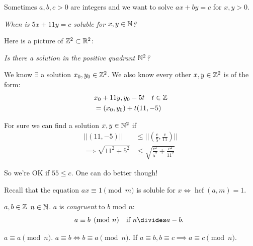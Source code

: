 \documentclass[10pt]{scrartcl}
\DeclareMathOperator{\hcf}{hcf}
\begin{document}
Sometimes $a,b, c >0$ are integers and we want to solve $ax + by = c$ for $x,y  > 0$.\\

\begin{example}
\emph{When is $5x + 11y = c$ soluble for $x,y \in\mathbb{N}$? }

Here is a picture of $\mathbb{Z}^2 \subset \mathbb{R}^2$: 

\begin{center}
\end{center}

\emph{Is there a solution in the positive quadrant $\mathbb{N}^2$?}


We know $\exists$ a solution $x_0,y_0\in\mathbb{Z}^2$. We also know every other $x,y \in\mathbb{Z}^2$ is of the form: 
\[
\begin{aligned}
 & x_0 + 11y, y_0 - 5t \quad t \in\mathbb{Z}\\
 &= (x_0,y_0) + t(11,-5)
\end{aligned}
\]

For sure we can find a solution $x,y \in\mathbb{N}^2$ if
\[
\begin{aligned}
  ||(11,-5)|| &\leq ||\textstyle{\left(\frac{c}{5},\frac{c}{11}\right)}||\\
  \implies \sqrt{11^2 + 5^2} &\leq \sqrt{\textstyle{\frac{c^2}{5^2}+\frac{c^2}{11^2}}}
\end{aligned}
\]

So we're OK if $55 \leq c$. One can do better though! 
\end{example}


Recall that the equation
$ax \equiv 1 \pmod{m}$
is soluble for $x \iff \hcf(a,m) = 1$.



\vspace*{8pt}

\begin{definition} 
$a,b\in\mathbb{Z}$ $n\in\mathbb{N}$. $a$ is \emph{congruent} to $b$ mod $n$: 
\[a \equiv b \pmod{n}\quad  \mbox{if $n \divides a - b$. } \]	
\end{definition}

\begin{remark}
$a \equiv a \pmod{n}$. $a \equiv b \iff b \equiv a \pmod{n}$. If $a \equiv b, b \equiv c \implies a \equiv c \pmod{n}$. 	
\end{remark}
\end{document}
